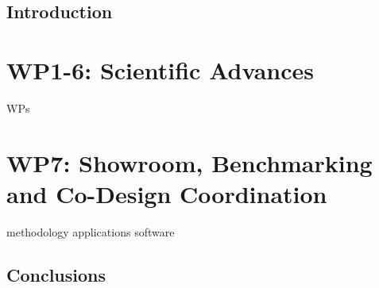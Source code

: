 \documentclass[11pt]{report}
\begin{document}

\makecover%


\clearpage
{}
\settableofcontents%
\tableofcontents


\clearpage
\setlistoffigures%
\listoffigures


\clearpage
\setlistoftables%
\listoftables





\chapter{Introduction}
\label{chap:introduction}


\part{WP1-6: Scientific Advances}
{WPs}
\part{WP7: Showroom, Benchmarking and Co-Design Coordination}
{methodology}
{applications}
{software}


\chapter{Conclusions}
\label{chap:conclusions}



\clearpage




\appendix






\makedisclaimer%
\end{document}
